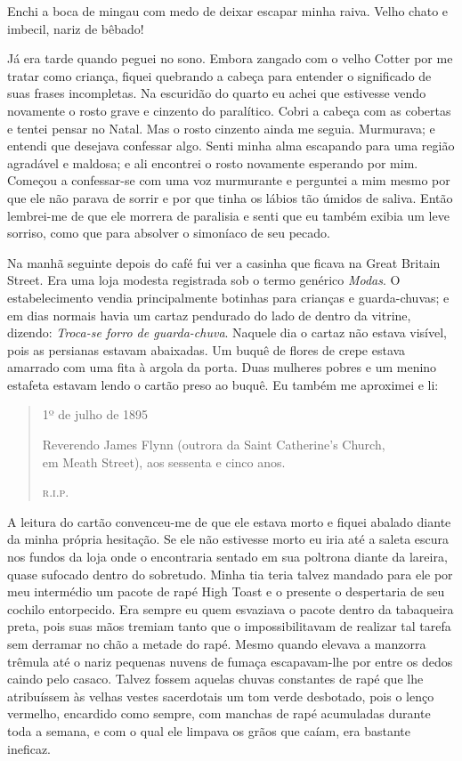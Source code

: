 Enchi a boca de mingau com medo de deixar escapar minha raiva.  Velho chato e
imbecil, nariz de bêbado!

Já era tarde quando peguei no sono.  Embora zangado com o velho Cotter por me
tratar como criança, fiquei quebrando a cabeça para entender o significado de
suas frases incompletas.  Na escuridão do quarto eu achei que estivesse vendo
novamente o rosto grave e cinzento do paralítico.  Cobri a cabeça com as
cobertas e tentei pensar no Natal.  Mas o rosto cinzento ainda me seguia.
Murmurava; e entendi que desejava confessar algo.  Senti minha alma escapando
para uma região agradável e maldosa; e ali encontrei o rosto novamente
esperando por mim.  Começou a confessar-se com uma voz murmurante e perguntei a
mim mesmo por que ele não parava de sorrir e por que tinha os lábios tão úmidos
de saliva.  Então lembrei-me de que ele morrera de paralisia e senti que eu
também exibia um leve sorriso, como que para absolver o simoníaco de seu
pecado.

Na manhã seguinte depois do café fui ver a casinha que ficava na Great Britain
Street.  Era uma loja modesta registrada sob o termo genérico \textit{Modas}.
O estabelecimento vendia principalmente botinhas para crianças e guarda-chuvas;
e em dias normais havia um cartaz pendurado do lado de dentro da vitrine,
dizendo: \textit{Troca-se forro de guarda-chuva}.  Naquele dia o cartaz não
estava visível, pois as persianas estavam abaixadas.  Um buquê de flores de
crepe estava amarrado com uma fita à argola da porta.  Duas mulheres pobres e
um menino estafeta estavam lendo o cartão preso ao buquê.  Eu também me
aproximei e li:

\begin{quote}\centering
1º de julho de 1895\smallskip

Reverendo James Flynn (outrora da Saint Catherine’s Church,\\
em Meath Street), aos sessenta e cinco anos.

\scshape r.i.p.
\end{quote}

A leitura do cartão convenceu-me de que ele estava morto e fiquei abalado
diante da minha própria hesitação.  Se ele não estivesse morto eu iria até a
saleta escura nos fundos da loja onde o encontraria sentado em sua poltrona
diante da lareira, quase sufocado dentro do sobretudo.  Minha tia teria talvez
mandado para ele por meu intermédio um pacote de rapé High Toast e o presente o
despertaria de seu cochilo entorpecido.  Era sempre eu quem esvaziava o pacote
dentro da tabaqueira preta, pois suas mãos tremiam tanto que o impossibilitavam
de realizar tal tarefa sem derramar no chão a metade do rapé.  Mesmo quando
elevava a manzorra trêmula até o nariz pequenas nuvens de fumaça escapavam-lhe
por entre os dedos caindo pelo casaco.  Talvez fossem aquelas chuvas constantes
de rapé que lhe atribuíssem às velhas vestes sacerdotais um tom verde
desbotado, pois o lenço vermelho, encardido como sempre, com manchas de rapé
acumuladas durante toda a semana, e com o qual ele limpava os grãos que caíam,
era bastante ineficaz.

